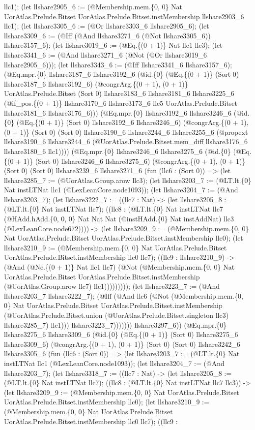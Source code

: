 \documentclass[11pt]{article}
\begin{document}
llc1); (let llshare2905\_6 := (@Membership.mem.\{0, 0\} Nat UorAtlas.Prelude.Bitset UorAtlas.Prelude.Bitset.instMembership llshare2903\_6 llc1); (let llshare3305\_6 := (@Or llshare3303\_6 llshare2905\_6); (let llshare3309\_6 := (@Iff (@And llshare3271\_6 (@Not llshare3305\_6)) llshare3157\_6); (let llshare3019\_6 := (@Eq.\{(0 + 1)\} Nat llc1 llc3); (let llshare3341\_6 := (@And llshare3271\_6 (@Not (@Or llshare3019\_6 llshare2905\_6))); (let llshare3343\_6 := (@Iff llshare3341\_6 llshare3157\_6); (@Eq.mpr.\{0\} llshare3187\_6 llshare3192\_6 (@id.\{0\} (@Eq.\{(0 + 1)\} (Sort 0) llshare3187\_6 llshare3192\_6) (@congrArg.\{(0 + 1), (0 + 1)\} UorAtlas.Prelude.Bitset (Sort 0) llshare3183\_6 llshare3181\_6 llshare3225\_6 (@if\_pos.\{(0 + 1)\} llshare3170\_6 llshare3173\_6 llc5 UorAtlas.Prelude.Bitset llshare3181\_6 llshare3176\_6))) (@Eq.mpr.\{0\} llshare3192\_6 llshare3246\_6 (@id.\{0\} (@Eq.\{(0 + 1)\} (Sort 0) llshare3192\_6 llshare3246\_6) (@congrArg.\{(0 + 1), (0 + 1)\} (Sort 0) (Sort 0) llshare3190\_6 llshare3244\_6 llshare3255\_6 (@propext llshare3190\_6 llshare3244\_6 (@UorAtlas.Prelude.Bitset.mem\_diff llshare3176\_6 llshare3180\_6 llc1)))) (@Eq.mpr.\{0\} llshare3246\_6 llshare3275\_6 (@id.\{0\} (@Eq.\{(0 + 1)\} (Sort 0) llshare3246\_6 llshare3275\_6) (@congrArg.\{(0 + 1), (0 + 1)\} (Sort 0) (Sort 0) llshare3239\_6 llshare3271\_6 (fun (llc6 : (Sort 0)) => (let llshare3285\_7 := (@UorAtlas.Group.arow llc3); (let llshare3203\_7 := (@LT.lt.\{0\} Nat instLTNat llc1 (@LexLeanCore.node1093)); (let llshare3204\_7 := (@And llshare3203\_7); (let llshare3222\_7 := ((llc7 : Nat) -> (let llshare3205\_8 := (@LT.lt.\{0\} Nat instLTNat llc7); ((llc8 : (@LT.lt.\{0\} Nat instLTNat llc7 (@HAdd.hAdd.\{0, 0, 0\} Nat Nat Nat (@instHAdd.\{0\} Nat instAddNat) llc3 (@LexLeanCore.node672)))) -> (let llshare3209\_9 := (@Membership.mem.\{0, 0\} Nat UorAtlas.Prelude.Bitset UorAtlas.Prelude.Bitset.instMembership llc0); (let llshare3210\_9 := (@Membership.mem.\{0, 0\} Nat UorAtlas.Prelude.Bitset UorAtlas.Prelude.Bitset.instMembership llc0 llc7); ((llc9 : llshare3210\_9) -> (@And (@Ne.\{(0 + 1)\} Nat llc1 llc7) (@Not (@Membership.mem.\{0, 0\} Nat UorAtlas.Prelude.Bitset UorAtlas.Prelude.Bitset.instMembership (@UorAtlas.Group.arow llc7) llc1))))))))); (let llshare3223\_7 := (@And llshare3203\_7 llshare3222\_7); (@Iff (@And llc6 (@Not (@Membership.mem.\{0, 0\} Nat UorAtlas.Prelude.Bitset UorAtlas.Prelude.Bitset.instMembership (@UorAtlas.Prelude.Bitset.union (@UorAtlas.Prelude.Bitset.singleton llc3) llshare3285\_7) llc1))) llshare3223\_7))))))) llshare3297\_6)) (@Eq.mpr.\{0\} llshare3275\_6 llshare3309\_6 (@id.\{0\} (@Eq.\{(0 + 1)\} (Sort 0) llshare3275\_6 llshare3309\_6) (@congrArg.\{(0 + 1), (0 + 1)\} (Sort 0) (Sort 0) llshare3242\_6 llshare3305\_6 (fun (llc6 : (Sort 0)) => (let llshare3203\_7 := (@LT.lt.\{0\} Nat instLTNat llc1 (@LexLeanCore.node1093)); (let llshare3204\_7 := (@And llshare3203\_7); (let llshare3318\_7 := ((llc7 : Nat) -> (let llshare3205\_8 := (@LT.lt.\{0\} Nat instLTNat llc7); ((llc8 : (@LT.lt.\{0\} Nat instLTNat llc7 llc3)) -> (let llshare3209\_9 := (@Membership.mem.\{0, 0\} Nat UorAtlas.Prelude.Bitset UorAtlas.Prelude.Bitset.instMembership llc0); (let llshare3210\_9 := (@Membership.mem.\{0, 0\} Nat UorAtlas.Prelude.Bitset UorAtlas.Prelude.Bitset.instMembership llc0 llc7); ((llc9 : 
\end{document}
